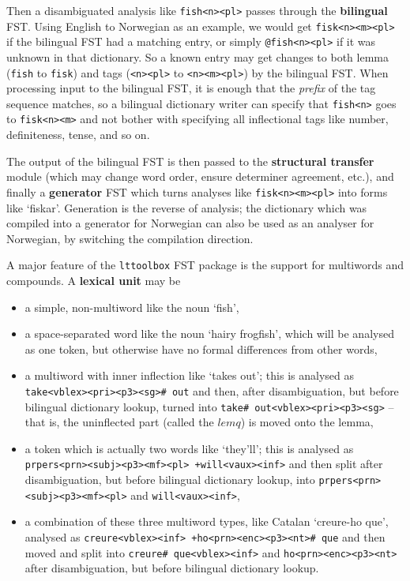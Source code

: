 \documentclass[10pt, a4paper]{article}
\newcommand{\ana}[1]{\texttt{#1}}
\newcommand{\f}[1]{`#1'}
\newcommand{\tool}[1]{\texttt{#1}}
\begin{document}
Then a disambiguated analysis like \ana{fish<n><pl>} passes through
the \textbf{bilingual} FST. Using English to Norwegian as an
example, we would get \ana{fisk<n><m><pl>} if the bilingual FST had a
matching entry, or simply \ana{@fish<n><pl>} if it was unknown in that
dictionary. So a known entry may get changes to both lemma
(\ana{fish} to \ana{fisk}) and tags
(\ana{<n><pl>} to \ana{<n><m><pl>}) by the bilingual FST. When
processing input to the bilingual FST, it is enough that the
\emph{prefix} of the tag sequence matches, so a bilingual dictionary
writer can specify that \ana{fish<n>} goes to \ana{fisk<n><m>} and not
bother with specifying all inflectional tags like number,
definiteness, tense, and so on.

The output of the bilingual FST is then passed to the
\textbf{structural transfer} module (which may change word order,
ensure determiner agreement, etc.), and finally a \textbf{generator}
FST which turns analyses like \ana{fisk<n><m><pl>} into forms like
\f{fiskar}. Generation is the reverse of analysis; the dictionary
which was compiled into a generator for Norwegian can also be used as
an analyser for Norwegian, by switching the compilation direction.

A major feature of the \tool{lttoolbox} FST package is the support
for multiwords and compounds. A \textbf{lexical unit} may be
\begin{itemize}
\item a simple, non-multiword like the noun \f{fish},
\item a space-separated word like the noun \f{hairy frogfish}, which
  will be analysed as one token, but otherwise have no formal
  differences from other words,
\item a multiword with inner inflection like \f{takes out}; this is
  analysed as \ana{take<vblex><pri><p3><sg>\# out} and then, after
  disambiguation, but before bilingual dictionary lookup, turned into
  \ana{take\# out<vblex><pri><p3><sg>} – that is, the uninflected part
  (called the $lemq$) is moved onto the lemma,
\item a token which is actually two words like \f{they'll}; this is
  analysed as \ana{prpers<prn><subj><p3><mf><pl> +will<vaux><inf>} and
  then split after disambiguation, but before bilingual dictionary
  lookup, into \ana{prpers<prn><subj><p3><mf><pl>} and
  \ana{will<vaux><inf>},
\item a combination of these three multiword types, like Catalan
  \f{creure-ho que}, analysed as \ana{creure<vblex><inf>
    +ho<prn><enc><p3><nt>\# que} and then moved and split into
  \ana{creure\# que<vblex><inf>} and \ana{ho<prn><enc><p3><nt>} after
  disambiguation, but before bilingual dictionary lookup.
\end{itemize}
\end{document}
